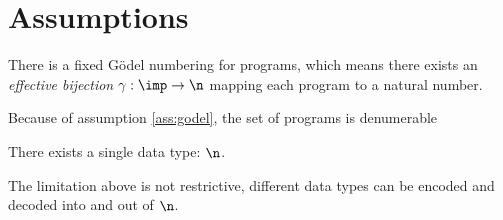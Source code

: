 \section{Assumptions}

\begin{assumption}\label{ass:godel}
  There is a fixed Gödel numbering for programs, which means there
  exists an \emph{effective bijection} \(\gamma : \imp \to \n\)
  mapping each program to a natural number.
\end{assumption}

\begin{observation}
  Because of assumption \ref{ass:godel}, the set of programs is
  denumerable
\end{observation}

\begin{assumption}\label{ass:data}
  There exists a single data type: \(\n\).
\end{assumption}

The limitation above is not restrictive, different data types can be
encoded and decoded into and out of \(\n\).
